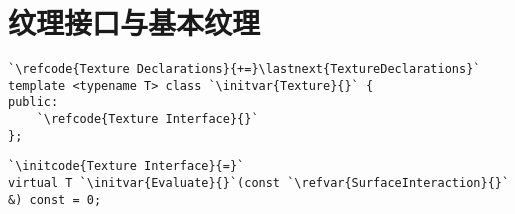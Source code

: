 \section{纹理接口与基本纹理}\label{sec:纹理接口与基本纹理}

\begin{lstlisting}
`\refcode{Texture Declarations}{+=}\lastnext{TextureDeclarations}`
template <typename T> class `\initvar{Texture}{}` {
public:
    `\refcode{Texture Interface}{}`
};
\end{lstlisting}

\begin{lstlisting}
`\initcode{Texture Interface}{=}`
virtual T `\initvar{Evaluate}{}`(const `\refvar{SurfaceInteraction}{}` &) const = 0;
\end{lstlisting}